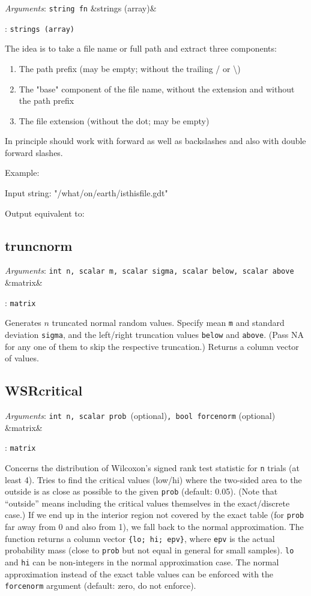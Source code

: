 \documentclass[11pt,english]{article}
\newcommand{\ArgRet}[2]{%
  {\it Arguments}: {#1}%
  \ifx&#2&%
  \else
  \par\smallskip\noindent {\it Return type}: \texttt{#2}
  \fi%
  \par\medskip\par%
  }
\begin{document}
\ArgRet{\texttt{string fn}}{strings (array)}

The idea is to take a file name or full path and extract three components:
\begin{enumerate}
\item The path prefix (may be empty; without the trailing / or \textbackslash)
\item The "base" component of the file name, without the extension and without the path prefix
\item The file extension (without the dot; may be empty)
\end{enumerate}
In principle should work with forward as well as backslashes and also with double forward slashes.

Example:

Input string: "/what/on/earth/isthisfile.gdt"

Output equivalent to:



\subsection{truncnorm}

\ArgRet{\texttt{int n, scalar m, scalar sigma, scalar below, scalar
above}}{matrix}

Generates $n$ truncated normal random values. Specify mean \texttt{m}
and standard deviation \texttt{sigma}, and the left/right truncation values
\texttt{below} and \texttt{above}. (Pass NA for any one of them to
skip the respective truncation.) Returns a column vector of values.


\subsection{WSRcritical}

\ArgRet{\texttt{int n, scalar prob }(optional)\texttt{, bool forcenorm}
(optional)}{matrix}

Concerns the distribution of Wilcoxon's signed rank test statistic for
\texttt{n} trials (at least 4). Tries to find the critical values
(low/hi) where the two-sided area to the outside is as close as
possible to the given \texttt{prob} (default: 0.05). (Note that
``outside'' means including the critical values themselves in the
exact/discrete case.) If we end up in the interior region not covered
by the exact table (for \texttt{prob} far away from 0 and also from
1), we fall back to the normal approximation. The function returns a
column vector \verb|{lo; hi; epv}|, where \texttt{epv} is the actual
probability mass (close to \texttt{prob} but not equal in general for
small samples). \texttt{lo} and \texttt{hi} can be non-integers in the normal
approximation case. The normal approximation instead of the exact
table values can be enforced with the \texttt{forcenorm} argument
(default: zero, do not enforce).
\end{document}

